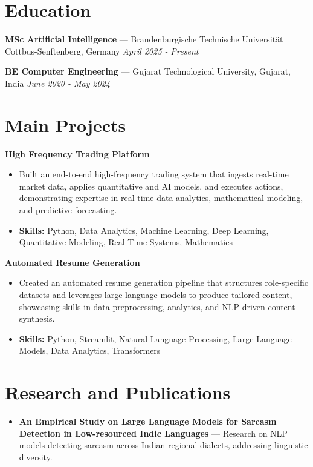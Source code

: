 \documentclass[a4paper,10pt]{article}
\begin{document}
\section*{Education}
\textbf{MSc Artificial Intelligence} — Brandenburgische Technische Universität Cottbus-Senftenberg, Germany \hfill \textit{April 2025 - Present}\par
\vspace{1.5pt}
\textbf{BE Computer Engineering} — Gujarat Technological University, Gujarat, India \hfill \textit{June 2020 - May 2024}\par

\section*{Main Projects}
\textbf{High Frequency Trading Platform}\par
\vspace{1pt}
\begin{itemize}
  \item Built an end-to-end high-frequency trading system that ingests real-time market data, applies quantitative and AI models, and executes actions, demonstrating expertise in real-time data analytics, mathematical modeling, and predictive forecasting.
  \item \textbf{Skills:} Python, Data Analytics, Machine Learning, Deep Learning, Quantitative Modeling, Real-Time Systems, Mathematics
\end{itemize}
\vspace{3pt}
\textbf{Automated Resume Generation}\par
\vspace{1pt}
\begin{itemize}
  \item Created an automated resume generation pipeline that structures role-specific datasets and leverages large language models to produce tailored content, showcasing skills in data preprocessing, analytics, and NLP-driven content synthesis.
  \item \textbf{Skills:} Python, Streamlit, Natural Language Processing, Large Language Models, Data Analytics, Transformers
\end{itemize}

\section*{Research and Publications}
\begin{itemize}
\item \textbf{An Empirical Study on Large Language Models for Sarcasm Detection in Low-resourced Indic Languages} — Research on NLP models detecting sarcasm across Indian regional dialects, addressing linguistic diversity.
\end{itemize}
\end{document}
